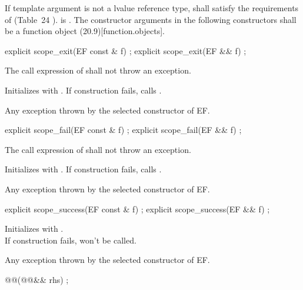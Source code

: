 \documentclass[ebook,11pt,article]{memoir}
\begin{document}
\pnum
\requires
If template argument  is not a lvalue reference type, 
 shall satisfy
the requirements of  (Table~24
).  is .
The constructor arguments  in the following constructors shall be a function object (20.9)[function.objects].

\begin{itemdecl}
explicit
scope_exit(EF const & f) ;
explicit
scope_exit(EF && f) ;
\end{itemdecl}

\begin{itemdescr}
\pnum
\requires The call expression of  shall not throw an exception. 

\pnum
\effects Initializes  with . If construction fails, calls .

\pnum
\throws Any exception thrown by the selected constructor of EF.

\end{itemdescr}


\begin{itemdecl}
explicit
scope_fail(EF const & f) ;
explicit
scope_fail(EF && f) ;
\end{itemdecl}

\begin{itemdescr}
\pnum
\requires The call expression of  shall not throw an exception.

\pnum
\effects Initializes  with . If construction fails, calls .

\pnum
\throws Any exception thrown by the selected constructor of EF.
\end{itemdescr}

\begin{itemdecl}
explicit
scope_success(EF const & f) ;
explicit
scope_success(EF && f) ;
\end{itemdecl}

\begin{itemdescr}
\pnum
\effects Initializes  with .\\
\enternote
If construction fails,  won't be called.
\exitnote

\pnum
\throws Any exception thrown by the selected constructor of EF.
\end{itemdescr}

\begin{itemdecl}
@@(@@&& rhs) ;
\end{itemdecl}
\end{document}
